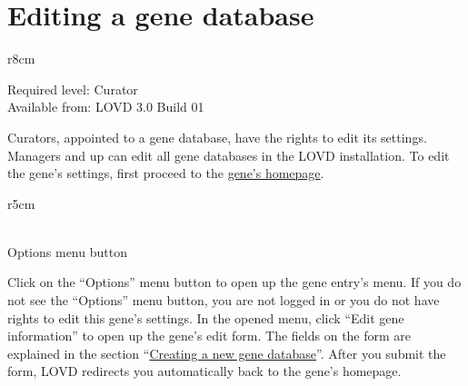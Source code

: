 %
%





\section{Editing a gene database}
\begin{wrapfigure}[3]{r}{8cm} %
  \vspace{-25pt}
  \begin{leftbar}
    Required level: Curator\\
    Available from: LOVD 3.0 Build 01
  \end{leftbar}
\end{wrapfigure}
Curators, appointed to a gene database, have the rights to edit its settings.
Managers and up can edit all gene databases in the LOVD installation.
To edit the gene's settings, first proceed to the \hyperlink{sec:gene_homepage}{gene's homepage}.

\begin{wrapfigure}[4]{r}{5cm} %
  \vspace{-25pt}
  \begin{framed}
    \\Options menu button
  \end{framed}
\end{wrapfigure}
Click on the ``Options'' menu button to open up the gene entry's menu.
If you do not see the ``Options'' menu button, you are not logged in or you do not have rights to edit this gene's settings.
In the opened menu, click ``Edit gene information'' to open up the gene's edit form.
The fields on the form are explained in the section ``\hyperlink{sec:gene_create}{Creating a new gene database}''.
After you submit the form, LOVD redirects you automatically back to the gene's homepage.





